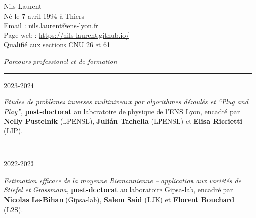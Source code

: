 
{\color{DefaultGray}
	\noindent
	Nils Laurent\\
	Né le 7 avril 1994 à Thiers\\
	Email : nils.laurent@ens-lyon.fr\\
	Page web : \url{https://nils-laurent.github.io/}\\
	Qualifié aux sections CNU 26 et 61\\
	\vspace{5mm}
	
	\noindent
	\textit{\Large \color{MyGray} \hspace{5mm} Parcours professionel et de formation}
	\vspace{2mm}
	{\color{DefaultGray}\hrule height .1pt}
	\vspace{4mm}
	
	\noindent
	\begin{minipage}{0.20\textwidth}
		\color{MyGray} 2023-2024
	\end{minipage}
	\hfill
	\begin{minipage}{0.70\textwidth}
		\emph{Etudes de problèmes inverses multiniveaux par algorithmes déroulés et ``Plug and Play''}, \textbf{post-doctorat} au laboratoire de physique de l'ENS Lyon, encadré par \textbf{Nelly Pustelnik} (LPENSL), \textbf{Julián Tachella} (LPENSL) et \textbf{Elisa Riccietti} (LIP).
	\end{minipage}\\
	\vspace{2mm}
	
	\noindent
	\begin{minipage}{0.20\textwidth}
		\color{MyGray} 2022-2023
	\end{minipage}
	\hfill
	\begin{minipage}{0.70\textwidth}
		\emph{Estimation efficace de la moyenne Riemannienne -- application aux variétés de Stiefel et Grassmann}, \textbf{post-doctorat} au laboratoire Gipsa-lab, encadré par \textbf{Nicolas Le-Bihan} (Gipsa-lab), \textbf{Salem Said} (LJK) et \textbf{Florent Bouchard} (L2S).
	\end{minipage}\\
	\vspace{2mm}
	
}
